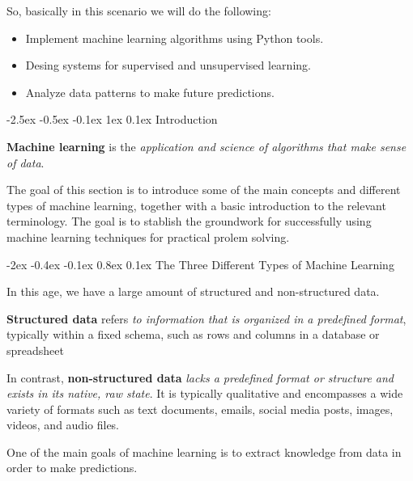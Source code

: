 \documentclass[12pt]{report}
\makeatletter
\renewcommand{\section}{\@startsection{section}{1}{\z@}%
  {-2.5ex \@plus -0.5ex \@minus -0.1ex}%
  {1ex \@plus 0.1ex}%
  {\normalfont\Large\sectionstyle}}
\newcommand{\sectionstyle}[1]{%
  \par\noindent\hrule
  \vspace{0.2ex}%
  {\scshape{#1}\par}%
  \vspace{0.4ex}%
  \hrule
}
\renewcommand{\subsection}{\@startsection{subsection}{2}{\z@}%
  {-2ex \@plus -0.4ex \@minus -0.1ex}%
  {0.8ex \@plus 0.1ex}%
  {\normalfont\large\subsectionstyle}}
\newcommand{\subsectionstyle}[1]{%
  \par\noindent\hrule
  \vspace{-0.4ex}%
  {\scshape #1\par}%
  \vspace{0.4ex}%
  \hrule
}
\theoremstyle{largebreak}
\makeatother
\begin{document}
    So, basically in this scenario we will do the following:
    \begin{itemize}
        \item Implement machine learning algorithms using Python tools.
        \item Desing systems for supervised and unsupervised learning.
        \item Analyze data patterns to make future predictions.
    \end{itemize}

    \section{Introduction}

    \begin{mydef}
        \textbf{Machine learning} is the\textit{ application and science of algorithms that make sense of data}.
    \end{mydef}

    The goal of this section is to introduce some of the main concepts and different types of machine learning, together with a basic introduction to the relevant terminology. The goal is to stablish the groundwork for successfully using machine learning techniques for practical prolem solving.

    \subsection{The Three Different Types of Machine Learning}

    In this age, we have a large amount of structured and non-structured data.

    \begin{mydef}
        \textbf{Structured data} refers \textit{to information that is organized in a predefined format}, typically within a fixed schema, such as rows and columns in a database or spreadsheet

        In contrast, \textbf{non-structured data} \textit{lacks a predefined format or structure and exists in its native, raw state}. It is typically qualitative and encompasses a wide variety of formats such as text documents, emails, social media posts, images, videos, and audio files.
    \end{mydef}

    One of the main goals of machine learning is to extract knowledge from data in order to make predictions.
\end{document}
